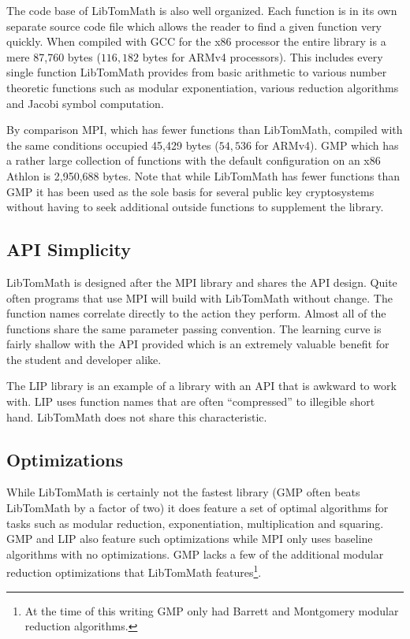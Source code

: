 \documentclass[b5paper]{book}
\begin{document}
The code base of LibTomMath is also well organized.  Each function is in its own separate source code file 
which allows the reader to find a given function very quickly.  When compiled with GCC for the x86 processor the entire 
library is a mere 87,760 bytes ($116,182$ bytes for ARMv4 processors).  This includes every single function 
LibTomMath provides from basic arithmetic to various number theoretic functions such as modular exponentiation, various 
reduction algorithms and Jacobi symbol computation.  

By comparison MPI, which has fewer functions than LibTomMath, compiled with the same conditions occupied 45,429 bytes 
($54,536$ for ARMv4).  GMP which has a rather large collection of functions with the default configuration on an 
x86 Athlon is 2,950,688 bytes.  Note that while LibTomMath has fewer functions than GMP it has been used as the sole basis 
for several public key cryptosystems without having to seek additional outside functions to supplement the library.

\subsection{API Simplicity}
LibTomMath is designed after the MPI library and shares the API design.  Quite often programs that use MPI will build 
with LibTomMath without change. The function names correlate directly to the action they perform.  Almost all of the 
functions share the same parameter passing convention.  The learning curve is fairly shallow with the API provided 
which is an extremely valuable benefit for the student and developer alike.  

The LIP library is an example of a library with an API that is awkward to work with.  LIP uses function names that are often ``compressed'' to 
illegible short hand.  LibTomMath does not share this characteristic.  

\subsection{Optimizations}
While LibTomMath is certainly not the fastest library (GMP often beats LibTomMath by a factor of two) it does
feature a set of optimal algorithms for tasks such as modular reduction, exponentiation, multiplication and squaring.  GMP 
and LIP also feature such optimizations while MPI only uses baseline algorithms with no optimizations.  GMP lacks a few
of the additional modular reduction optimizations that LibTomMath features\footnote{At the time of this writing GMP
only had Barrett and Montgomery modular reduction algorithms.}.  
\end{document}
